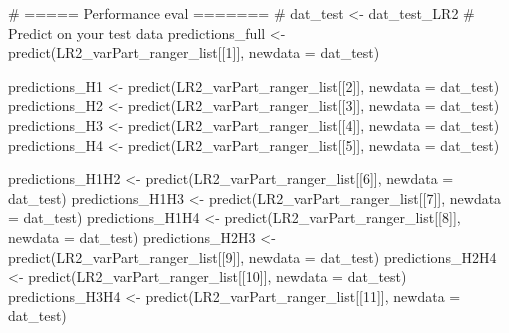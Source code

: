 \documentclass[
  letterpaper,
  DIV=11,
  numbers=noendperiod]{scrreprt}
\newenvironment{Shaded}{\begin{snugshade}}{\end{snugshade}}
\newcommand{\AttributeTok}[1]{\textcolor[rgb]{0.40,0.45,0.13}{#1}}
\newcommand{\CommentTok}[1]{\textcolor[rgb]{0.37,0.37,0.37}{#1}}
\newcommand{\DecValTok}[1]{\textcolor[rgb]{0.68,0.00,0.00}{#1}}
\newcommand{\FunctionTok}[1]{\textcolor[rgb]{0.28,0.35,0.67}{#1}}
\newcommand{\NormalTok}[1]{\textcolor[rgb]{0.00,0.23,0.31}{#1}}
\newcommand{\OtherTok}[1]{\textcolor[rgb]{0.00,0.23,0.31}{#1}}
\begin{document}
\begin{Shaded}
\begin{Highlighting}[]
\CommentTok{\# ===== Performance eval ======= \#}
\NormalTok{dat\_test }\OtherTok{\textless{}{-}}\NormalTok{ dat\_test\_LR2}
\CommentTok{\# Predict on your test data}
\NormalTok{predictions\_full }\OtherTok{\textless{}{-}} \FunctionTok{predict}\NormalTok{(LR2\_varPart\_ranger\_list[[}\DecValTok{1}\NormalTok{]], }\AttributeTok{newdata =}\NormalTok{ dat\_test)}

\NormalTok{predictions\_H1 }\OtherTok{\textless{}{-}} \FunctionTok{predict}\NormalTok{(LR2\_varPart\_ranger\_list[[}\DecValTok{2}\NormalTok{]], }\AttributeTok{newdata =}\NormalTok{ dat\_test)}
\NormalTok{predictions\_H2 }\OtherTok{\textless{}{-}} \FunctionTok{predict}\NormalTok{(LR2\_varPart\_ranger\_list[[}\DecValTok{3}\NormalTok{]], }\AttributeTok{newdata =}\NormalTok{ dat\_test)}
\NormalTok{predictions\_H3 }\OtherTok{\textless{}{-}} \FunctionTok{predict}\NormalTok{(LR2\_varPart\_ranger\_list[[}\DecValTok{4}\NormalTok{]], }\AttributeTok{newdata =}\NormalTok{ dat\_test)}
\NormalTok{predictions\_H4 }\OtherTok{\textless{}{-}} \FunctionTok{predict}\NormalTok{(LR2\_varPart\_ranger\_list[[}\DecValTok{5}\NormalTok{]], }\AttributeTok{newdata =}\NormalTok{ dat\_test)}

\NormalTok{predictions\_H1H2 }\OtherTok{\textless{}{-}} \FunctionTok{predict}\NormalTok{(LR2\_varPart\_ranger\_list[[}\DecValTok{6}\NormalTok{]], }\AttributeTok{newdata =}\NormalTok{ dat\_test)}
\NormalTok{predictions\_H1H3 }\OtherTok{\textless{}{-}} \FunctionTok{predict}\NormalTok{(LR2\_varPart\_ranger\_list[[}\DecValTok{7}\NormalTok{]], }\AttributeTok{newdata =}\NormalTok{ dat\_test)}
\NormalTok{predictions\_H1H4 }\OtherTok{\textless{}{-}} \FunctionTok{predict}\NormalTok{(LR2\_varPart\_ranger\_list[[}\DecValTok{8}\NormalTok{]], }\AttributeTok{newdata =}\NormalTok{ dat\_test)}
\NormalTok{predictions\_H2H3 }\OtherTok{\textless{}{-}} \FunctionTok{predict}\NormalTok{(LR2\_varPart\_ranger\_list[[}\DecValTok{9}\NormalTok{]], }\AttributeTok{newdata =}\NormalTok{ dat\_test)}
\NormalTok{predictions\_H2H4 }\OtherTok{\textless{}{-}} \FunctionTok{predict}\NormalTok{(LR2\_varPart\_ranger\_list[[}\DecValTok{10}\NormalTok{]], }\AttributeTok{newdata =}\NormalTok{ dat\_test)}
\NormalTok{predictions\_H3H4 }\OtherTok{\textless{}{-}} \FunctionTok{predict}\NormalTok{(LR2\_varPart\_ranger\_list[[}\DecValTok{11}\NormalTok{]], }\AttributeTok{newdata =}\NormalTok{ dat\_test)}


\end{Highlighting}
\end{Shaded}
\end{document}
